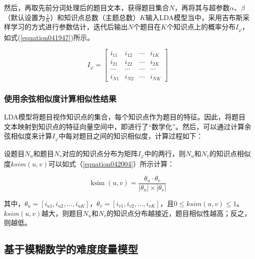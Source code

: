 然后，再取先前分词处理后的题目文本，获得题目集合$N$，再将其与超参数$\alpha$、$\beta$（默认设置为$\frac{1}{K}$）和知识点总数（主题总数）$K$输入LDA模型当中，采用吉布斯采样学习的方式进行参数估计，迭代后输出$N$个题目在$K$个知识点上的概率分布$I_{\varphi}$，如式(\ref{equation041947})所示。

\begin{equation}
    \label{equation041947}
    I_{\varphi}=\left[\begin{array}{cccc}
        i_{11} & i_{12} & \cdots & i_{1 K} \\
        i_{21} & i_{22} & \cdots & i_{2 K} \\
        \cdots & \cdots & \cdots & \cdots \\
        i_{N 1} & i_{N 2} & \cdots & i_{N K}
        \end{array}\right]
\end{equation}

\subsubsection{使用余弦相似度计算相似性结果}

LDA模型将题目视作知识点的集合，每个知识点作为题目的特征。因此，将题目文本映射到知识点的特征向量空间中，即进行了“数学化”。然后，可以通过计算余弦相似度来计算$I_{\varphi}$中每对题目之间的知识相似度，计算过程如下：

设题目$N_{u}$和题目$N_{v}$对应的知识点分布为矩阵$I_{\varphi}$中的两行，则$N_{u}$和$N_{v}$的知识点相似度$ksim(u,v)$可以如式（\ref{equation042004}）所示计算：

\begin{equation}
\label{equation042004}
\operatorname{ksim}(u, v)=\frac{\theta_{u} \cdot \theta_{v}}{\left|\theta_{u}\right| \times\left|\theta_{v}\right|}
\end{equation}

其中，$\theta_{u} = \left [ i_{u1},i_{u2}, \dots, i_{uK} \right ] $，$\theta_{v} = \left [ i_{v1},i_{v2}, \dots, i_{vK} \right ] $，且$0 \le ksim(u,v) \le 1$。$ksim(u,v)$越大，则题目$N_{u}$和$N_{v}$的知识点分布越接近，题目相似性越高；反之，则越低。

\subsection{基于模糊数学的难度度量模型}

